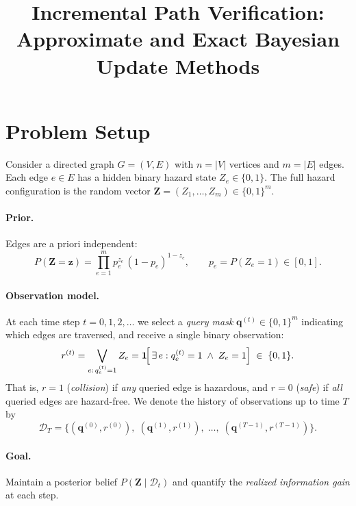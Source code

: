 \documentclass[11pt]{article}
\title{Incremental Path Verification:\\Approximate and Exact Bayesian Update Methods}
\author{}
\date{}
\begin{document}
\maketitle

\section{Problem Setup}

Consider a directed graph $G = (V, E)$ with $n = |V|$ vertices and
$m = |E|$ edges.  Each edge $e \in E$ has a hidden binary hazard state
$Z_e \in \{0, 1\}$.  The full hazard configuration is the random vector
$\mathbf{Z} = (Z_1, \dots, Z_m) \in \{0,1\}^m$.

\paragraph{Prior.}
Edges are a priori independent:
\[
  P(\mathbf{Z} = \mathbf{z})
  = \prod_{e=1}^{m} p_e^{z_e}\,(1-p_e)^{1-z_e},
  \qquad p_e = P(Z_e = 1) \in [0,1].
\]

\paragraph{Observation model.}
At each time step $t = 0, 1, 2, \dots$ we select a \emph{query mask}
$\mathbf{q}^{(t)} \in \{0,1\}^m$ indicating which edges are traversed,
and receive a single binary observation:
\[
  r^{(t)}
  = \bigvee_{e:\, q_e^{(t)} = 1} Z_e
  = \mathbf{1}\!\Bigl[\,\exists\, e : q_e^{(t)} = 1 \;\wedge\; Z_e = 1\Bigr]
  \;\in\;\{0,1\}.
\]
That is, $r = 1$ (\emph{collision}) if \emph{any} queried edge is
hazardous, and $r = 0$ (\emph{safe}) if \emph{all} queried edges are
hazard-free.  We denote the history of observations up to time $T$ by
\[
  \mathcal{D}_T = \bigl\{(\mathbf{q}^{(0)}, r^{(0)}),\;
                          (\mathbf{q}^{(1)}, r^{(1)}),\;
                          \dots,\;
                          (\mathbf{q}^{(T-1)}, r^{(T-1)})\bigr\}.
\]

\paragraph{Goal.}
Maintain a posterior belief $P(\mathbf{Z} \mid \mathcal{D}_t)$ and
quantify the \emph{realized information gain} at each step.

\end{document}
